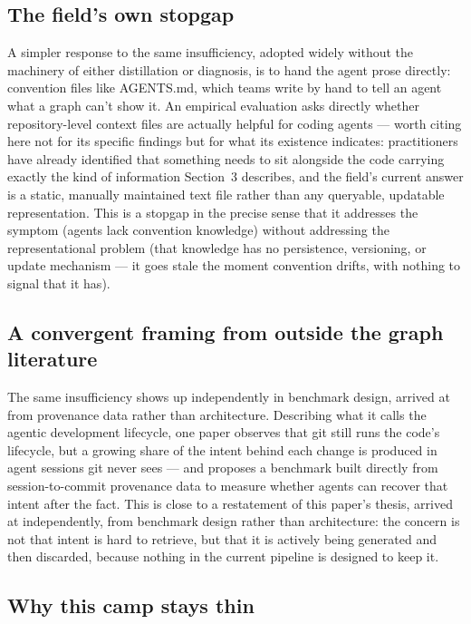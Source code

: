 \documentclass[11pt]{article}
\begin{document}
\subsection{The field's own stopgap}

A simpler response to the same insufficiency, adopted widely without the machinery of either distillation or diagnosis, is to hand the agent prose directly: convention files like AGENTS.md, which teams write by hand to tell an agent what a graph can't show it. An empirical evaluation asks directly whether repository-level context files are actually helpful for coding agents \citep{agentsmd2026} --- worth citing here not for its specific findings but for what its existence indicates: practitioners have already identified that something needs to sit alongside the code carrying exactly the kind of information Section~3 describes, and the field's current answer is a static, manually maintained text file rather than any queryable, updatable representation. This is a stopgap in the precise sense that it addresses the symptom (agents lack convention knowledge) without addressing the representational problem (that knowledge has no persistence, versioning, or update mechanism --- it goes stale the moment convention drifts, with nothing to signal that it has).

\subsection{A convergent framing from outside the graph literature}

The same insufficiency shows up independently in benchmark design, arrived at from provenance data rather than architecture. Describing what it calls the agentic development lifecycle, one paper observes that git still runs the code's lifecycle, but a growing share of the intent behind each change is produced in agent sessions git never sees \citep{rekalbench2026} --- and proposes a benchmark built directly from session-to-commit provenance data to measure whether agents can recover that intent after the fact. This is close to a restatement of this paper's thesis, arrived at independently, from benchmark design rather than architecture: the concern is not that intent is hard to retrieve, but that it is actively being generated and then discarded, because nothing in the current pipeline is designed to keep it.

\subsection{Why this camp stays thin}
\end{document}

